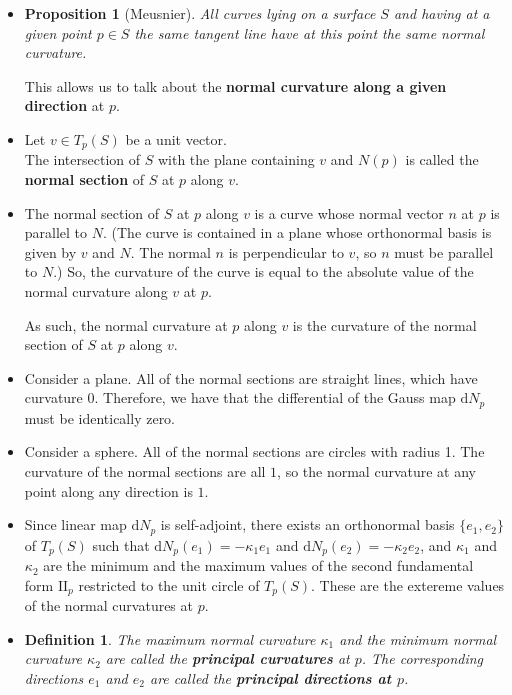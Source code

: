 \documentclass[10pt]{article}
\newtheorem{definition}[lemma]{Definition}
\newtheorem{proposition}[lemma]{Proposition}
\newcommand{\dee}{\mathrm{d}}
\newcommand{\II}{\mathrm{II}}
\begin{document}
\begin{itemize}
    \item \begin{proposition}[Meusnier]
      All curves lying on a surface $S$ and having at a given point $p \in S$ the same tangent line have at this point the same normal curvature.
    \end{proposition}

    This allows us to talk about the {\bf normal curvature along a given direction} at $p$.

    \item Let $v \in T_p(S)$ be a unit vector.\\
    The intersection of $S$ with the plane containing $v$ and $N(p)$ is called the {\bf normal section} of $S$ at $p$ along $v$.

    \item The normal section of $S$ at $p$ along $v$ is a curve whose normal vector $n$ at $p$ is parallel to $N$. (The curve is contained in a plane whose orthonormal basis is given by $v$ and $N$. The normal $n$ is perpendicular to $v$, so $n$ must be parallel to $N$.) So, the curvature of the curve is equal to the absolute value of the normal curvature along $v$ at $p$.

    As such, the normal curvature at $p$ along $v$ is the curvature of the normal section of $S$ at $p$ along $v$.

    \item Consider a plane. All of the normal sections are straight lines, which have curvature $0$. Therefore, we have that the differential of the Gauss map $\dee N_p$ must be identically zero.

    \item Consider a sphere. All of the normal sections are circles with radius 1. The curvature of the normal sections are all $1$, so the normal curvature at any point along any direction is $1$.

    \item Since linear map $\dee N_p$ is self-adjoint, there exists an orthonormal basis $\{ e_1, e_2 \}$ of $T_p(S)$ such that $\dee N_p(e_1) = -\kappa_1 e_1$ and $\dee N_p(e_2) = -\kappa_2 e_2$, and $\kappa_1$ and $\kappa_2$ are the minimum and the maximum values of the second fundamental form $\II_p$ restricted to the unit circle of $T_p(S)$. These are the extereme values of the normal curvatures at $p$.

    \item \begin{definition}
      The maximum normal curvature $\kappa_1$ and the minimum normal curvature $\kappa_2$ are called the {\bf principal curvatures} at $p$. The corresponding directions $e_1$ and $e_2$ are called the {\bf principal directions at $p$}.
    \end{definition}


\end{itemize}
\end{document}
